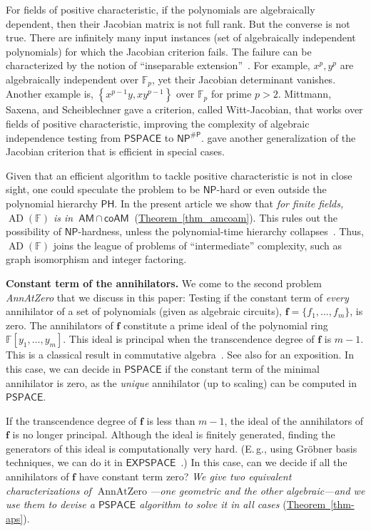 \documentclass[11pt]{article}
\numberwithin{equation}{section}
\theoremstyle{definition}
\theoremstyle{plain}
\newcommand{\cclass}[1]{\textsf{#1}}
\newcommand{\Eg}{E.\,g.}
\newcommand{\expref}[2]{\hyperref[#2]{#1~\ref{#2}}}
\newcommand{\F}{\mathbb{F}}
\newcommand{\Pclass}{\cclass{P}\xspace}  %
\newcommand{\NP}{\cclass{NP}\xspace}  %
\newcommand{\AM}{\cclass{AM}\xspace}  %
\newcommand{\coAM}{\cclass{coAM}\xspace}  %
\newcommand{\AMcapcoAM}{\AM\,\cap\,\coAM}  %
\newcommand{\PSPACE}{\cclass{PSPACE}\xspace}  %
\newcommand{\EXPSPACE}{\cclass{EXPSPACE}\xspace} %
\newcommand{\PH}{\cclass{PH}\xspace}  %
\DeclareMathOperator{\AD}{\mathrm{AD}\xspace} %
\DeclareMathOperator{\AnnAtZero}{\mathrm{AnnAtZero}\xspace} %
\begin{document}
For fields of positive characteristic, if the polynomials are algebraically dependent, then their Jacobian matrix is not full rank.
But the converse is not true. There are infinitely many input instances (set of algebraically independent polynomials) for which the Jacobian criterion fails. The failure can be characterized by the notion of ``inseparable extension''~\cite{pandey2016algebraic}. For example, $x^p, y^p$ are algebraically independent over $\mathbb{F}_p$, yet their Jacobian determinant vanishes. Another example is, $\left\{ x^{p-1}y, xy^{p-1} \right\}$ over $\mathbb{F}_p$ for prime $p>2$. 
%
%
Mittmann, %
Saxena, and Scheiblechner  %
\cite{mittmann2014algebraic} gave a criterion, called Witt-Jacobian,
that works over fields of
%
%
%
%
positive characteristic,
improving the complexity of
%
%
algebraic independence testing  %
from $\PSPACE$ to
%
$\NP^{\#\Pclass}$.  %
\cite{pandey2016algebraic} gave another generalization of the
Jacobian criterion that is efficient in special cases.
 
Given that an efficient algorithm to tackle 
%
positive characteristic %
is not in close sight, one could speculate the problem to be $\NP$-hard or even outside the polynomial hierarchy 
%
$\PH$. %
In
%
the present article   %
we show
%
that \emph{for finite fields,
%
$\AD(\F)$   %
is in
%
$\AMcapcoAM$}   %
(\expref{Theorem}{thm_amcoam}). This rules out the possibility of
$\NP$-hardness, %
%
unless the polynomial-time hierarchy collapses~\cite{AB09}.
%
Thus,
%
$\AD(\F)$   %
joins the league of problems of ``intermediate'' complexity,
%
%
such as   %
graph isomorphism
%
and   %
integer factoring. 
 
 \smallskip\noindent
\textbf{Constant term of the annihilators.}
We come to the second problem
\emph{AnnAtZero}  %
that we discuss in this paper: Testing if the constant term of \emph{every}
%
annihilator    %
%
of a set  %
of polynomials
%
%
(given as algebraic circuits),
%
$\mathbf{f}=\{f_1,\ldots,f_m\}$, is zero. 
The annihilators of $\mathbf{f}$ constitute a prime ideal of the polynomial ring $\F[y_1,\ldots,y_m]$. This ideal is principal when the transcendence degree of  $\mathbf{f}$ is $m-1$. This is a classical result in commutative algebra~\cite[Theorem~47]{Mat80}. See also \cite[Lemma~7]{Kay09} for an exposition. In this case, we can decide
%
in $\PSPACE$  %
if the constant term of the minimal annihilator is zero,
%
as the \emph{unique} annihilator (up to scaling) can be computed in $\PSPACE$. 
 
If
the  %
transcendence degree of $\mathbf{f}$ is less than $m-1$, the ideal of the annihilators of $\mathbf{f}$ is no longer principal. Although the ideal is finitely generated, finding the generators of this ideal is computationally very hard. (\Eg, using Gr\"obner basis techniques, we can do it in
%
$\EXPSPACE$~\cite[Section~1.2.1]{derksen2015computational}.) In this case, can we decide if all the annihilators of $\mathbf{f}$ have constant term zero? \emph{We give two equivalent characterizations of $\AnnAtZero$---one geometric and the other
%
algebraic---and we use them to  %
devise a $\PSPACE$ algorithm to solve it in all cases} (\expref{Theorem}{thm-aps}).
 
\end{document}
